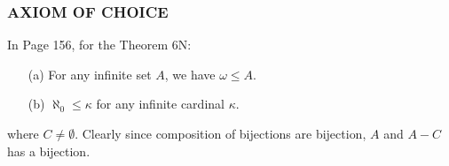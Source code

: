 \subsubsection{AXIOM OF CHOICE}
In Page 156, for the Theorem 6N:
\begin{leftbar}
    \begin{itemize}
        \item[(a)] For any infinite set \( A \), we have \( \omega \leq A \).
        \item[(b)] \( \aleph_0 \leq \kappa \) for any infinite cardinal \( \kappa \).
    \end{itemize}
\end{leftbar}


where \(C \neq \emptyset \).
Clearly since composition of bijections are bijection, \(A\) and \(A - C\) has a bijection.

